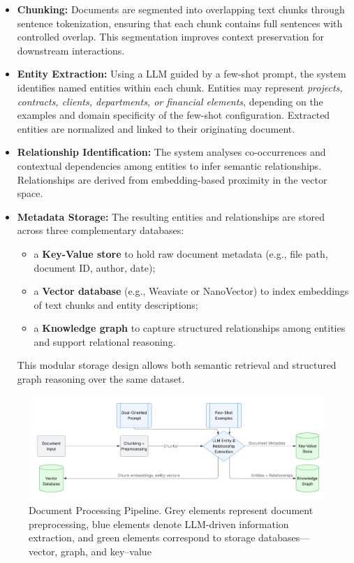 \begin{itemize}
    \item \textbf{Chunking:} Documents are segmented into overlapping text chunks through sentence tokenization, ensuring that each chunk contains full sentences with controlled overlap. This segmentation improves context preservation for downstream interactions.
    
    \item \textbf{Entity Extraction:} Using a \gls{LLM} guided by a few-shot prompt, the system identifies named entities within each chunk. Entities may represent \textit{projects, contracts, clients, departments, or financial elements}, depending on the examples and domain specificity of the few-shot configuration. Extracted entities are normalized and linked to their originating document.
    
    \item \textbf{Relationship Identification:} The system analyses co-occurrences and contextual dependencies among entities to infer semantic relationships. Relationships are derived from embedding-based proximity in the vector space.
    
    \item \textbf{Metadata Storage:} The resulting entities and relationships are stored across three complementary databases:
    \begin{itemize}
        \item a \textbf{Key-Value store} to hold raw document metadata (e.g., file path, document ID, author, date);
        \item a \textbf{Vector database} (e.g., Weaviate or NanoVector) to index embeddings of text chunks and entity descriptions;
        \item a \textbf{Knowledge graph} to capture structured relationships among entities and support relational reasoning.
    \end{itemize}
    This modular storage design allows both semantic retrieval and structured graph reasoning over the same dataset.
\end{itemize}
\begin{figure}
    \centering
    \includegraphics[width=1\linewidth]{Images/Fluxograma_Data_Processing_Pipeline.jpeg}
    \caption{Document Processing Pipeline.
Grey elements represent document preprocessing, blue elements denote LLM-driven information extraction, and green elements correspond to storage databases— vector, graph, and key–value}\label{fig:data-pipeline}
\end{figure}

